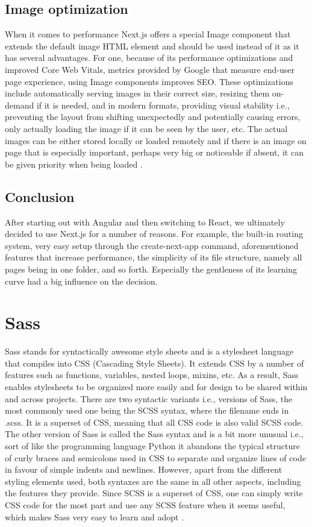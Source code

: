 \subsection{Image optimization}
When it comes to performance Next.js offers a special Image component that extends the default image HTML element and should be used instead of
it as it has several advantages. For one, because of its performance optimizations and improved Core Web Vitals, metrics provided by Google that
measure end-user page experience, using Image components improves SEO. These optimizations include automatically serving images in their correct
size, resizing them on-demand if it is needed, and in modern formats, providing visual stability i.e., preventing the layout from shifting unexpectedly
and potentially causing errors, only actually loading the image if it can be seen by the user, etc. The actual images can be either stored locally
or loaded remotely and if there is an image on page that is especially important, perhaps very big or noticeable if absent, it can be given priority
when being loaded \cite{NextjsImageOptimization}.
\\
\subsection{Conclusion}
After starting out with Angular and then switching to React, we ultimately decided to use Next.js for a number of reasons. For example, the built-in
routing system, very easy setup through the create-next-app command, aforementioned features that increase performance, the simplicity of its
file structure, namely all pages being in one folder, and so forth. Especially the gentleness of its learning curve had a big influence on the decision.

\section{Sass}
Sass stands for syntactically awesome style sheets and is a stylesheet language that compiles into CSS (Cascading Style Sheets). It extends CSS by a number
of features such as functions, variables, nested loops, mixins, etc. As a result, Sass enables stylesheets to be organized more easily and for design
to be shared within and across projects. There are two syntactic variants i.e., versions of Sass, the most commonly used one being the SCSS syntax, where the
filename ends in .scss. It is a superset of CSS, meaning that all CSS code is also valid SCSS code. The other version of Sass is called the Sass syntax
and is a bit more unusual i.e., sort of like the programming language Python it abandons the typical structure of curly braces and semicolons used in CSS
to separate and organize lines of code in favour of simple indents and newlines. However, apart from the different styling elements used, both syntaxes
are the same in all other aspects, including the features they provide. Since SCSS is a superset of CSS, one can simply write CSS code for the most part
and use any SCSS feature when it seems useful, which makes Sass very easy to learn and adopt \cite{SassFeatures}.
\\
